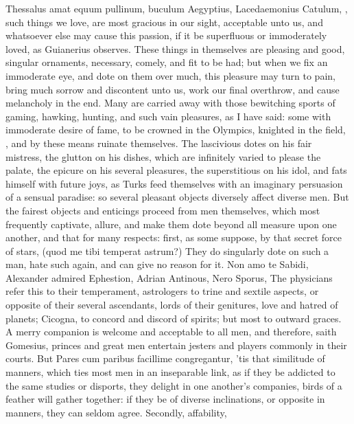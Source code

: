 {Thessalus amat equum pullinum, buculum Aegyptius, Lacedaemonius
Catulum, \etc{}, such things we love, are most gracious in our sight,
acceptable unto us, and whatsoever else may cause this passion, if it
be superfluous or immoderately loved, as Guianerius observes. These
things in themselves are pleasing and good, singular ornaments,
necessary, comely, and fit to be had; but when we fix an immoderate
eye, and dote on them over much, this pleasure may turn to pain, bring
much sorrow and discontent unto us, work our final overthrow, and cause
melancholy in the end. Many are carried away with those bewitching
sports of gaming, hawking, hunting, and such vain pleasures, as I
have said: some with immoderate desire of fame, to be crowned in the
Olympics, knighted in the field, \etc{}, and by these means ruinate
themselves. The lascivious dotes on his fair mistress, the glutton on
his dishes, which are infinitely varied to please the palate, the
epicure on his several pleasures, the superstitious on his idol, and
fats himself with future joys, as Turks feed themselves with an
imaginary persuasion of a sensual paradise: so several pleasant objects
diversely affect diverse men. But the fairest objects and enticings
proceed from men themselves, which most frequently captivate, allure,
and make them dote beyond all measure upon one another, and that for
many respects: first, as some suppose, by that secret force of stars,
(quod me tibi temperat astrum?) They do singularly dote on such a man,
hate such again, and can give no reason for it. Non amo te
Sabidi, \etc{} Alexander admired Ephestion, Adrian Antinous, Nero Sporus,
\etc{} The physicians refer this to their temperament, astrologers to
trine and sextile aspects, or opposite of their several ascendants,
lords of their genitures, love and hatred of planets;  Cicogna,
to concord and discord of spirits; but most to outward graces. A merry
companion is welcome and acceptable to all men, and therefore, saith
Gomesius, princes and great men entertain jesters and players
commonly in their courts. But Pares cum paribus facillime
congregantur, 'tis that similitude of manners, which ties most
men in an inseparable link, as if they be addicted to the same studies
or disports, they delight in one another's companies, birds of a
feather will gather together: if they be of diverse inclinations, or
opposite in manners, they can seldom agree. Secondly, affability,
}
